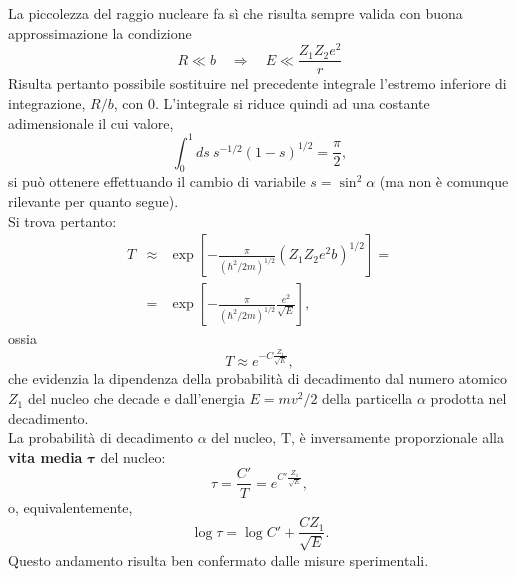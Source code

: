 La piccolezza del raggio nucleare fa sì che risulta sempre valida con buona approssimazione la condizione
\begin{equation}
R\ll b \quad \Rightarrow \quad E \ll \frac{Z_1 Z_2 e^2}{r}
\end{equation}
Risulta pertanto possibile sostituire nel precedente integrale l'estremo inferiore di integrazione, $R/b$, con $0$. L'integrale si riduce quindi ad una costante adimensionale il cui valore,
\begin{equation}
\int _{0} ^1 ds\ s^{-1/2} (1-s)^{1/2}= \frac{\pi}{2},
\end{equation}
si può ottenere effettuando il cambio di variabile $s= \sin^2 \alpha$ (ma non è comunque rilevante per quanto segue).\\
Si trova pertanto:
\begin{eqnarray}
T&\approx & \exp \left[ -\frac{\pi}{(\hbar ^2 /2m)^{1/2}}\left(Z_1 Z_2 e^2 b\right)^{1/2}\right]= \nonumber \\
&=&\exp \left[ -\frac{\pi}{(\hbar ^2 /2m)^{1/2}}\frac{e^2}{\sqrt{E}}\right],
\end{eqnarray}
ossia
\begin{equation}
T \approx e^{-C\frac{Z_1}{\sqrt{E}}},
\end{equation}
che evidenzia la dipendenza della probabilità di decadimento dal numero atomico $Z_1$ del nucleo che decade e dall'energia $E=mv^2/2$ della particella $\alpha$ prodotta nel decadimento.\\
La probabilità di decadimento $\alpha$ del nucleo, T, è inversamente proporzionale alla \textbf{vita media} $\mathbf{\tau}$ del nucleo:
\begin{equation}
\tau=\frac{C'}{T}=e^{C'\frac{Z_1}{\sqrt{E}}},
\end{equation}
o, equivalentemente,
\begin{equation}
\log \tau = \log C' + \frac{C Z_1}{\sqrt{E}}.
\end{equation}
Questo andamento risulta ben confermato dalle misure sperimentali.
